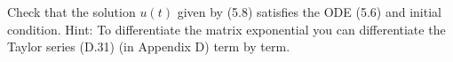 

Check that the solution $u(t)$ given by (5.8) satisfies the ODE (5.6) and
initial condition.  Hint: To differentiate the matrix exponential you can
differentiate the Taylor series (D.31) (in Appendix D) term by term.

